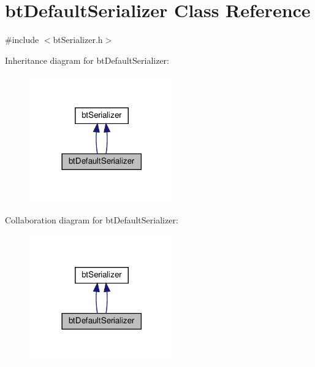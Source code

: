 \hypertarget{classbtDefaultSerializer}{}\section{bt\+Default\+Serializer Class Reference}
\label{classbtDefaultSerializer}


{\ttfamily \#include $<$bt\+Serializer.\+h$>$}



Inheritance diagram for bt\+Default\+Serializer\+:
\nopagebreak
\begin{figure}[H]
\begin{center}
\leavevmode
\includegraphics[width=177pt]{classbtDefaultSerializer__inherit__graph}
\end{center}
\end{figure}


Collaboration diagram for bt\+Default\+Serializer\+:
\nopagebreak
\begin{figure}[H]
\begin{center}
\leavevmode
\includegraphics[width=177pt]{classbtDefaultSerializer__coll__graph}
\end{center}
\end{figure}
